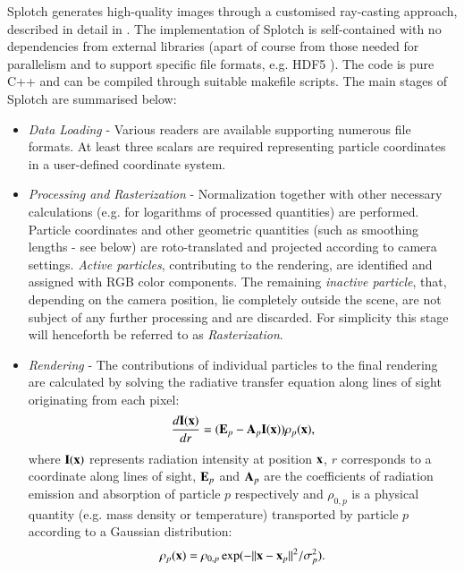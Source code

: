 \documentclass[1p]{elsarticle}
\begin{document}
Splotch generates high-quality images through a customised ray-casting approach, described in detail in \cite{2008NJPh...10l5006D}.  
The implementation of Splotch is self-contained with no dependencies from external libraries (apart of course from those needed for parallelism and to support specific file formats, e.g. HDF5 \cite{hdf5}). The code is pure C++ and can be compiled through suitable makefile scripts.
The main stages of Splotch are summarised below:
\begin{itemize}
\item
{\it Data Loading} - Various readers are available supporting numerous file formats. At least three scalars are required representing particle coordinates in a user-defined coordinate system.
\item
{\it Processing and Rasterization} - Normalization together with other necessary 
calculations (e.g. for logarithms of processed quantities) are performed. Particle
coordinates and other geometric quantities (such as smoothing lengths - see below) are
roto-translated and projected according to camera settings.
{\it Active particles},  contributing to the rendering, are identified and assigned with RGB color components. The remaining
{\it inactive particle}, that, depending on the camera position, lie completely outside the scene, are not subject of any further processing and are discarded.
For simplicity this stage will henceforth be referred to as {\it Rasterization}.
\item
{\it Rendering} - The contributions of individual particles to the final rendering are calculated by solving the radiative transfer equation  \cite{1991par..book.....S} along lines of sight originating from each pixel:
\begin{equation}\label{rad}
\frac{d{\bf I}{(\bf x})}{dr}=({\bf E}_p-{\bf A}_p{\bf I}({\bf x}))\rho_p({\bf x}),
\end{equation}
where ${\bf I}({\bf x})$ represents radiation intensity at position ${\bf x}$, $r$ corresponds to a coordinate along lines of sight,  ${\bf E}_p$ and ${\bf A}_p$ are the coefficients of radiation emission and absorption of particle $p$ respectively and $\rho_{0,p}$ is a physical quantity (e.g. mass density or temperature) transported by particle $p$ according to a Gaussian distribution:
\begin{equation}\label{kernel}
\rho_p({\bf x}) = \rho_{0,p}\exp(-{||{\bf x}-{\bf x}_p||}^2/\sigma_p^2).
\end{equation}
 

\end{itemize}
\end{document}
